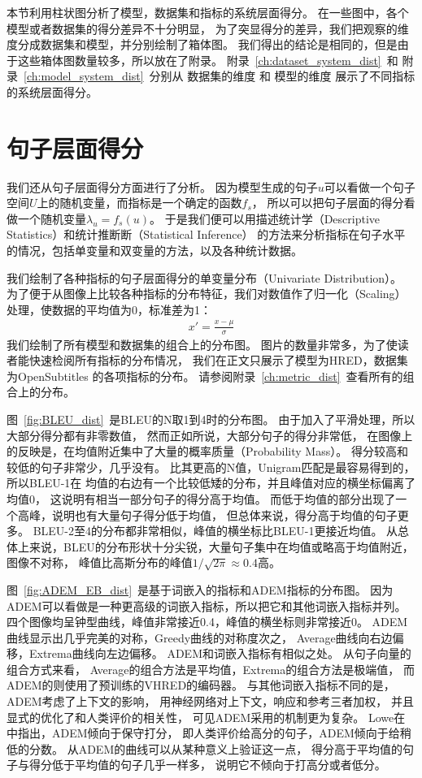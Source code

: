 本节利用柱状图分析了模型，数据集和指标的系统层面得分。
在一些图中，各个模型或者数据集的得分差异不十分明显，
为了突显得分的差异，我们把观察的维度分成数据集和模型，并分别绘制了箱体图。
我们得出的结论是相同的，但是由于这些箱体图数量较多，所以放在了附录。
附录~\ref{ch:dataset_system_dist}~和
附录~\ref{ch:model_system_dist}~分别从
数据集的维度
和
模型的维度
展示了不同指标的系统层面得分。

\section{句子层面得分}\label{sec:utterance_scores}
我们还从句子层面得分方面进行了分析。
因为模型生成的句子$u$可以看做一个句子空间$U$上的随机变量，而指标是一个确定的函数$f_{s}$，
所以可以把句子层面的得分看做一个随机变量$\lambda_u = f_{s}(u)$。
于是我们便可以用描述统计学（Descriptive Statistics）和统计推断断（Statistical Inference）
的方法来分析指标在句子水平的情况，包括单变量和双变量的方法，以及各种统计数据。

我们绘制了各种指标的句子层面得分的单变量分布（Univariate Distribution）。
为了便于从图像上比较各种指标的分布特征，我们对数值作了归一化（Scaling）处理，使数据的平均值为0，标准差为1：
\begin{align}
    x' = \frac{x - \mu}{\sigma}
\end{align}
我们绘制了所有模型和数据集的组合上的分布图。
图片的数量非常多，为了使读者能快速检阅所有指标的分布情况，
我们在正文只展示了模型为HRED，数据集为OpenSubtitles
的各项指标的分布。
请参阅附录~\ref{ch:metric_dist}~查看所有的组合上的分布。


图~\ref{fig:BLEU_dist}~是BLEU的N取1到4时的分布图。
由于加入了平滑处理，所以大部分得分都有非零数值，
然而正如\cite{HowNot}所说，大部分句子的得分非常低，
在图像上的反映是，在均值附近集中了大量的概率质量（Probability Mass）。
得分较高和较低的句子非常少，几乎没有。
比其更高的N值，Unigram匹配是最容易得到的，所以BLEU-1在
均值的右边有一个比较低矮的分布，并且峰值对应的横坐标偏离了均值0，
这说明有相当一部分句子的得分高于均值。
而低于均值的部分出现了一个高峰，说明也有大量句子得分低于均值，
但总体来说，得分高于均值的句子更多。
BLEU-2至4的分布都非常相似，峰值的横坐标比BLEU-1更接近均值。
从总体上来说，BLEU的分布形状十分尖锐，大量句子集中在均值或略高于均值附近，
图像不对称， 峰值比高斯分布的峰值$1 / \sqrt{2 \pi} \approx 0.4$高。


图~\ref{fig:ADEM_EB_dist}~是基于词嵌入的指标和ADEM指标的分布图。
因为ADEM可以看做是一种更高级的词嵌入指标，所以把它和其他词嵌入指标并列。
四个图像均呈钟型曲线，峰值非常接近0.4，峰值的横坐标则非常接近0。
ADEM曲线显示出几乎完美的对称，Greedy曲线的对称度次之，
Average曲线向右边偏移，Extrema曲线向左边偏移。
ADEM和词嵌入指标有相似之处。
从句子向量的组合方式来看，
Average的组合方法是平均值，Extrema的组合方法是极端值，
而ADEM的则使用了预训练的VHRED的编码器。
与其他词嵌入指标不同的是，ADEM考虑了上下文的影响，
用神经网络对上下文，响应和参考三者加权，
并且显式的优化了和人类评价的相关性，
可见ADEM采用的机制更为复杂。
Lowe在\cite{ADEM}中指出，ADEM倾向于保守打分，
即人类评价给高分的句子，ADEM倾向于给稍低的分数。
从ADEM的曲线可以从某种意义上验证这一点，
得分高于平均值的句子与得分低于平均值的句子几乎一样多，
说明它不倾向于打高分或者低分。

